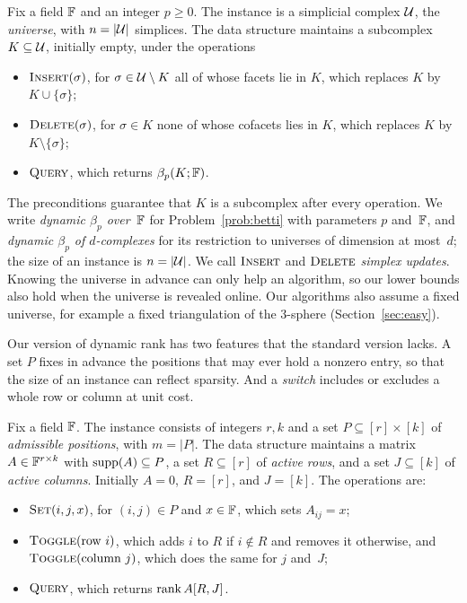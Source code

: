 \begin{problem}\label{prob:betti}
Fix a field $\mathbb{F}$ and an integer $p\ge0$.
The instance is a simplicial complex $\mathcal{U}$, the \emph{universe}, with $n=|\mathcal{U}|$ simplices.
The data structure maintains a subcomplex $K\subseteq\mathcal{U}$, initially empty, under the operations
\begin{itemize}
\item $\textsc{Insert}(\sigma)$, for $\sigma\in\mathcal{U}\setminus K$ all of whose facets lie in $K$, which replaces $K$ by $K\cup\{\sigma\}$;
\item $\textsc{Delete}(\sigma)$, for $\sigma\in K$ none of whose cofacets lies in $K$, which replaces $K$ by $K\setminus\{\sigma\}$;
\item $\textsc{Query}$, which returns $\beta_p(K;\mathbb{F})$.
\end{itemize}
\end{problem}

The preconditions guarantee that $K$ is a subcomplex after every operation.
We write \emph{dynamic $\beta_p$ over~$\mathbb{F}$} for Problem~\ref{prob:betti} with parameters $p$ and~$\mathbb{F}$, and \emph{dynamic $\beta_p$ of $d$-complexes} for its restriction to universes of dimension at most~$d$; the size of an instance is $n=|\mathcal{U}|$.
We call $\textsc{Insert}$ and $\textsc{Delete}$ \emph{simplex updates}.
Knowing the universe in advance can only help an algorithm, so our lower bounds also hold when the universe is revealed online.
Our algorithms also assume a fixed universe, for example a fixed triangulation of the $3$-sphere (Section~\ref{sec:easy}).

Our version of dynamic rank has two features that the standard version lacks.
A set $P$ fixes in advance the positions that may ever hold a nonzero entry, so that the size of an instance can reflect sparsity.
And a \emph{switch} includes or excludes a whole row or column at unit cost.

\begin{problem}\label{prob:rank}
Fix a field $\mathbb{F}$.
The instance consists of integers $r,k$ and a set $P\subseteq[r]\times[k]$ of \emph{admissible positions}, with $m=|P|$.
The data structure maintains a matrix $A\in\mathbb{F}^{r\times k}$ with $\operatorname{supp}(A)\subseteq P$, a set $R\subseteq[r]$ of \emph{active rows}, and a set $J\subseteq[k]$ of \emph{active columns}.
Initially $A=0$, $R=[r]$, and $J=[k]$.
The operations are:
\begin{itemize}
\item $\textsc{Set}(i,j,x)$, for $(i,j)\in P$ and $x\in\mathbb{F}$, which sets $A_{ij}=x$;
\item $\textsc{Toggle}(\text{row }i)$, which adds $i$ to $R$ if $i\notin R$ and removes it otherwise, and $\textsc{Toggle}(\text{column }j)$, which does the same for $j$ and~$J$;
\item $\textsc{Query}$, which returns $\operatorname{rank} A[R,J]$.
\end{itemize}
\end{problem}

